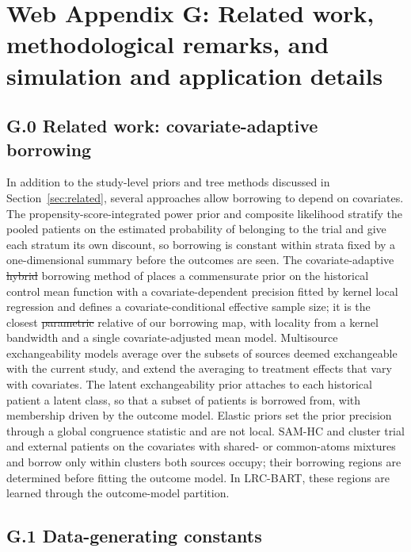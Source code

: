 \documentclass[11pt]{article}
\theoremstyle{definition}
\theoremstyle{plain}
\providecommand{\DIFaddtex}[1]{{\protect\color{blue}\uwave{#1}}} %
\providecommand{\DIFdeltex}[1]{{\protect\color{red}\sout{#1}}}                      %
\providecommand{\DIFaddbegin}{} %
\providecommand{\DIFaddend}{} %
\providecommand{\DIFdelbegin}{} %
\providecommand{\DIFdelend}{} %
\providecommand{\DIFadd}[1]{\texorpdfstring{\DIFaddtex{#1}}{#1}} %
\providecommand{\DIFdel}[1]{\texorpdfstring{\DIFdeltex{#1}}{}} %
\newcommand{\DIFscaledelfig}{0.5}
\newlength{\DIFdelgraphicswidth} %
\newlength{\DIFdelgraphicsheight} %
\newcommand{\DIFaddincludegraphics}[2][]{{\color{blue}\fbox{\DIFOincludegraphics[#1]{#2}}}} %
\newcommand{\DIFdelincludegraphics}[2][]{%
\sbox{\DIFdelgraphicsbox}{\DIFOincludegraphics[#1]{#2}}%
\settoboxwidth{\DIFdelgraphicswidth}{\DIFdelgraphicsbox} %
\settoboxtotalheight{\DIFdelgraphicsheight}{\DIFdelgraphicsbox} %
\scalebox{\DIFscaledelfig}{%
\parbox[b]{\DIFdelgraphicswidth}{\usebox{\DIFdelgraphicsbox}\\[-\baselineskip] \rule{\DIFdelgraphicswidth}{0em}}\llap{\resizebox{\DIFdelgraphicswidth}{\DIFdelgraphicsheight}{%
\setlength{\unitlength}{\DIFdelgraphicswidth}%
\begin{picture}(1,1)%
\thicklines\linethickness{2pt} %
{\color[rgb]{1,0,0}\put(0,0){\framebox(1,1){}}}%
{\color[rgb]{1,0,0}\put(0,0){\line( 1,1){1}}}%
{\color[rgb]{1,0,0}\put(0,1){\line(1,-1){1}}}%
\end{picture}%
}\hspace*{3pt}}} %
} %
\DeclareRobustCommand{\DIFaddbegin}{\DIFOaddbegin \let\includegraphics\DIFaddincludegraphics} %
\DeclareRobustCommand{\DIFaddend}{\DIFOaddend \let\includegraphics\DIFOincludegraphics} %
\DeclareRobustCommand{\DIFdelbegin}{\DIFOdelbegin \let\includegraphics\DIFdelincludegraphics} %
\DeclareRobustCommand{\DIFdelend}{\DIFOaddend \let\includegraphics\DIFOincludegraphics} %
\begin{document}
\section*{Web Appendix G: Related work, methodological remarks, and simulation and application details}

\subsection*{G.0 Related work: covariate-adaptive borrowing}

In addition to the study-level priors and tree methods discussed in Section~\ref{sec:related}, several approaches allow borrowing to depend on covariates. The propensity-score-integrated power prior \citep{Wang2019PSPP} and composite likelihood \citep{Chen2020PSCL} stratify the pooled patients on the estimated probability of belonging to the trial and give each stratum its own discount, so borrowing is constant within strata fixed by a one-dimensional summary before the outcomes are seen. The covariate-adaptive \DIFdelbegin \DIFdel{hybrid }\DIFdelend \DIFaddbegin \DIFadd{historical control }\DIFaddend borrowing method of \citet{Jin2023CAHB} places a commensurate prior on the historical control mean function with a covariate-dependent precision fitted by kernel local regression and defines a covariate-conditional effective sample size; it is the closest \DIFdelbegin \DIFdel{parametric }\DIFdelend \DIFaddbegin \DIFadd{kernel-local }\DIFaddend relative of our borrowing map, with locality from a kernel bandwidth and a single covariate-adjusted mean model. Multisource exchangeability models \citep{Kaizer2018MEM} average over the subsets of sources deemed exchangeable with the current study, and \citet{Kotalik2021} extend the averaging to treatment effects that vary with covariates. The latent exchangeability prior \citep{Alt2024LEAP} attaches to each historical patient a latent class, so that a subset of patients is borrowed from, with membership driven by the outcome model. Elastic priors \citep{Jiang2023elastic} set the prior precision through a global congruence statistic and are not local. SAM-HC \citep{Bi2026SAMHC} and \citet{Chandra2023} cluster trial and external patients on the covariates with shared- or common-atoms mixtures and borrow only within clusters both sources occupy; their borrowing regions are determined before fitting the outcome model. In LRC-BART, these regions are learned through the outcome-model partition.

\subsection*{G.1 Data-generating constants}
\end{document}
